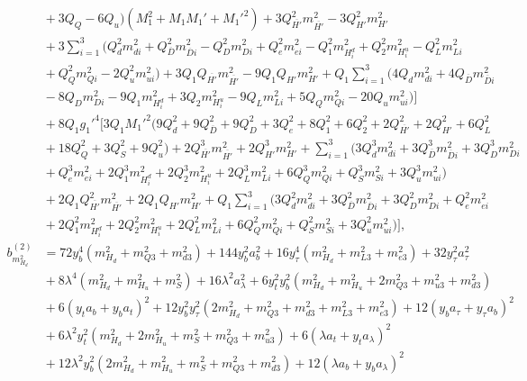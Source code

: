 \documentclass[preprint,amsmath,amssymb,aps,superscriptaddress,prd,showpacs,floatfix,nofootinbib]{revtex4-1}
\begin{document}
\begin{subequations}
\begin{align}
&{}+3Q_Q-6Q_u\big )\left ( M_1^2+M_1M_1'+M_1'^2\right )+3Q_{\overline{H'}}^2m_{\overline{H'}}^2-3Q_{H'}^2m_{H'}^2\nonumber\\
&{}+3\sum_{i=1}^3\big ( Q_d^2m_{di}^2+Q_{\overline{D}}^2m_{\overline{D}i}^2-Q_D^2m_{Di}^2+Q_e^2m_{ei}^2-Q_1^2m_{H_i^d}^2+Q_2^2m_{H_i^u}^2-Q_L^2m_{Li}^2\nonumber\\
&{}+Q_Q^2m_{Qi}^2-2Q_u^2m_{ui}^2\big )+3Q_1Q_{\overline{H'}}m_{\overline{H'}}^2-9Q_1Q_{H'}m_{H'}^2+Q_1\sum_{i=1}^3\bigg ( 4Q_dm_{di}^2+4Q_{\overline{D}}m_{\overline{D}i}^2\nonumber\\
&{}-8Q_Dm_{Di}^2-9Q_1m_{H_i^d}^2+3Q_2m_{H_i^u}^2-9Q_Lm_{Li}^2+5Q_Qm_{Qi}^2-20Q_um_{ui}^2\big )\bigg ]\nonumber\\
&{}+8Q_1g_1'^4\bigg [ 3Q_1M_1'^2\big ( 9Q_d^2+9Q_{\overline{D}}^2+9Q_D^2+3Q_e^2+8Q_1^2+6Q_2^2+2Q_{\overline{H'}}^2+2Q_{H'}^2+6Q_L^2\nonumber\\
&{}+18Q_Q^2+3Q_S^2+9Q_u^2\big )+2Q_{\overline{H'}}^3m_{\overline{H'}}^2+2Q_{H'}^3m_{H'}^2+\sum_{i=1}^3\big ( 3Q_d^3m_{di}^2+3Q_{\overline{D}}^3m_{\overline{D}i}^2+3Q_D^3m_{Di}^2\nonumber\\
&{}+Q_e^3m_{ei}^2+2Q_1^3m_{H_i^d}^2+2Q_2^3m_{H_i^u}^2+2Q_L^3m_{Li}^2+6Q_Q^3m_{Qi}^2+Q_S^3m_{Si}^2+3Q_u^3m_{ui}^2\big )\nonumber\\
&{}+2Q_1Q_{\overline{H'}}^2m_{\overline{H'}}^2+2Q_1Q_{H'}m_{H'}^2+Q_1\sum_{i=1}^3\big ( 3Q_d^2m_{di}^2+3Q_{\overline{D}}^2m_{\overline{D}i}^2+3Q_D^2m_{Di}^2+Q_e^2m_{ei}^2\nonumber\\
&{}+2Q_1^2m_{H_i^d}^2+2Q_2^2m_{H_i^u}^2+2Q_L^2m_{Li}^2+6Q_Q^2m_{Qi}^2+Q_S^2m_{Si}^2+3Q_u^2m_{ui}^2\big )\bigg ],\label{eq:USSMmHd2BetaTwoLoop}\\
b_{m_{H_d}^2}^{(2)}&=72y_b^4\left ( m_{H_d}^2+m_{Q3}^2+m_{d3}^2\right )+144y_b^2a_b^2+16y_\tau^4\left ( m_{H_d}^2+m_{L3}^2+m_{e3}^2\right )+32y_\tau^2 a_\tau^2\nonumber\\
&{}+8\lambda^4\left ( m_{H_d}^2+m_{H_u}^2+m_S^2\right )+16\lambda^2 a_\lambda^2+6y_t^2y_b^2\left ( m_{H_d}^2+m_{H_u}^2+2m_{Q3}^2+m_{u3}^2+m_{d3}^2\right )\nonumber\\
&{}+6\left ( y_t a_b+y_b a_t\right )^2+12y_b^2y_\tau^2\left ( 2m_{H_d}^2+m_{Q3}^2+m_{d3}^2+m_{L3}^2+m_{e3}^2\right )+12\left ( y_b a_\tau + y_\tau a_b\right )^2\nonumber\\
&{}+6\lambda^2y_t^2\left ( m_{H_d}^2+2m_{H_u}^2+m_S^2+m_{Q3}^2+m_{u3}^2\right )+6\left ( \lambda a_t+y_ta_\lambda\right )^2\nonumber\\
&{}+12\lambda^2y_b^2\left ( 2m_{H_d}^2+m_{H_u}^2+m_S^2+m_{Q3}^2+m_{d3}^2\right )+12\left ( \lambda a_b+y_b a_\lambda\right )^2\nonumber\\

\end{align}
\end{subequations}
\end{document}
